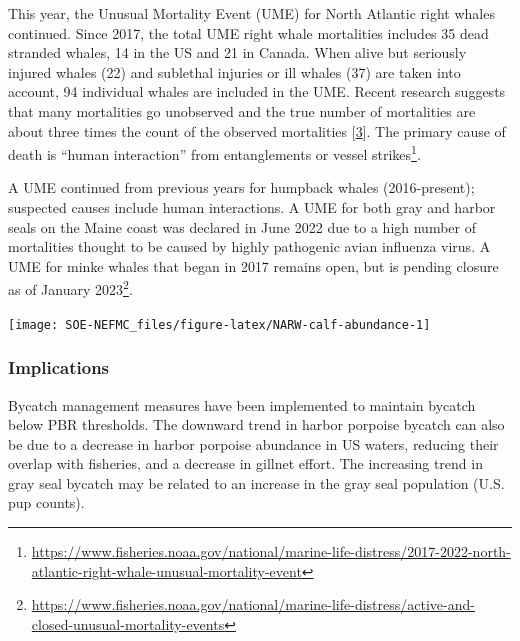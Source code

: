 \documentclass[
  10pt,
]{article}
\let\origfigure\figure
\let\endorigfigure\endfigure
\renewenvironment{figure}[1][2] {
    \expandafter\origfigure\expandafter[H]
} {
    \endorigfigure
}
\begin{document}
This year, the Unusual Mortality Event (UME) for North Atlantic right whales continued. Since 2017, the total UME right whale mortalities includes 35 dead stranded whales, 14 in the US and 21 in Canada. When alive but seriously injured whales (22) and sublethal injuries or ill whales (37) are taken into account, 94 individual whales are included in the UME. Recent research suggests that many mortalities go unobserved and the true number of mortalities are about three times the count of the observed mortalities {[}\protect\hyperlink{ref-pace_cryptic_2021}{3}{]}. The primary cause of death is ``human interaction'' from entanglements or vessel strikes\footnote{\url{https://www.fisheries.noaa.gov/national/marine-life-distress/2017-2022-north-atlantic-right-whale-unusual-mortality-event}}.

A UME continued from previous years for humpback whales (2016-present); suspected causes include human interactions. A UME for both gray and harbor seals on the Maine coast was declared in June 2022 due to a high number of mortalities thought to be caused by highly pathogenic avian influenza virus. A UME for minke whales that began in 2017 remains open, but is pending closure as of January 2023\footnote{\url{https://www.fisheries.noaa.gov/national/marine-life-distress/active-and-closed-unusual-mortality-events}}.

\begin{figure}

{\centering \texttt{[image: SOE-NEFMC\_files/figure-latex/NARW-calf-abundance-1]} 

}

\caption{Number of North Atlantic right whale calf births, 1990 - 2021.}\label{fig:NARW-calf-abundance}
\end{figure}

\hypertarget{implications-5}{%
\subsubsection{Implications}\label{implications-5}}

Bycatch management measures have been implemented to maintain bycatch below PBR thresholds. The downward trend in harbor porpoise bycatch can also be due to a decrease in harbor porpoise abundance in US waters, reducing their overlap with fisheries, and a decrease in gillnet effort. The increasing trend in gray seal bycatch may be related to an increase in the gray seal population (U.S. pup counts).
\end{document}
